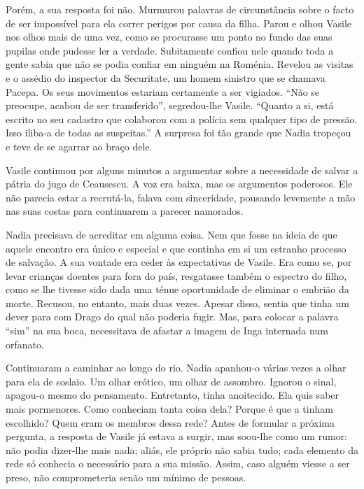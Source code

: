 Porém, a sua resposta foi não. Murmurou palavras de circunstância sobre
o facto de ser impossível para ela correr perigos por causa da filha.
Parou e olhou Vasile nos olhos mais de uma vez, como se procurasse um
ponto no fundo das suas pupilas onde pudesse ler a verdade. Subitamente confiou nele quando toda a gente sabia que não se podia confiar
em ninguém na Roménia. Revelou as visitas e o assédio do inspector da
Securitate, um homem sinistro que se chamava Pacepa. Os seus movimentos
estariam certamente a ser vigiados. ``Não se preocupe, acabou de ser
transferido'', segredou-lhe Vasile. ``Quanto a si, está escrito no seu
cadastro que colaborou com a polícia sem qualquer tipo de pressão. Isso
iliba-a de todas as suspeitas.'' A surpresa foi tão grande que Nadia
tropeçou e teve de se agarrar ao braço dele.

Vasile continuou por alguns minutos a argumentar
sobre a necessidade de salvar a pátria do jugo de Ceausescu. A voz era
baixa, mas os argumentos poderosos. Ele não parecia estar a recrutá-la,
falava com sinceridade, pousando levemente a mão nas suas costas para
continuarem a parecer namorados.

Nadia precisava de acreditar em alguma coisa. Nem que fosse na ideia de
que aquele encontro era único e especial e que continha em si um
estranho processo de salvação. A sua vontade era ceder às expectativas
de Vasile. Era como se, por levar crianças doentes para fora do país,
resgatasse também o espectro do filho, como se lhe tivesse sido dada uma
ténue oportunidade de eliminar o embrião da morte. Recusou, no entanto,
mais duas vezes. Apesar disso, sentia que tinha um dever para com Drago
do qual
não poderia fugir. Mas, para colocar a palavra ``sim'' na sua boca,
necessitava de afastar a imagem de Inga internada num orfanato.

Continuaram a caminhar ao longo do rio. Nadia apanhou-o várias vezes a
olhar para ela de soslaio. Um olhar erótico, um olhar de assombro.
Ignorou o sinal, apagou-o mesmo do pensamento. Entretanto, tinha
anoitecido. Ela quis saber mais pormenores. Como conheciam tanta coisa
dela? Porque é que a tinham escolhido? Quem eram os membros dessa rede?
Antes de formular a próxima pergunta, a resposta de Vasile já estava a
surgir, mas soou-lhe como um rumor: não podia dizer-lhe mais nada;
aliás, ele próprio não sabia tudo; cada elemento da rede só conhecia o
necessário para a sua missão. Assim, caso alguém viesse a ser preso, não
comprometeria senão um mínimo de pessoas.

